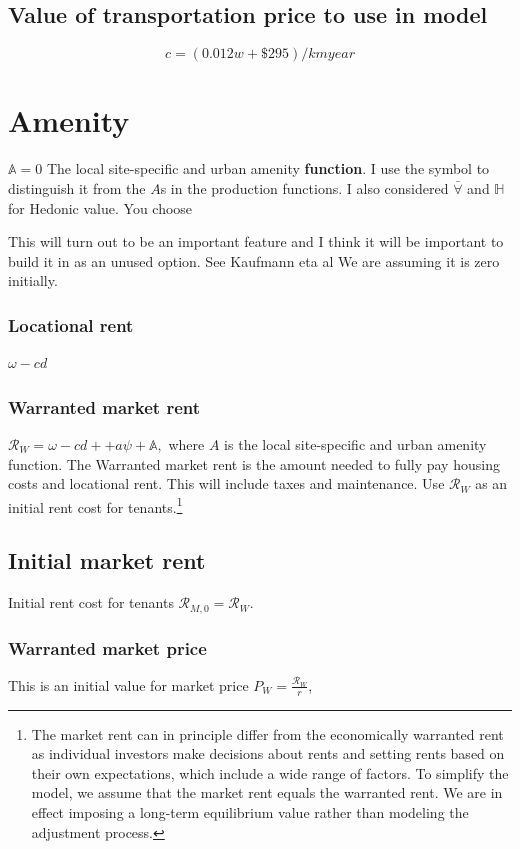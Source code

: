\subsection{Value of transportation price to use in model}
\[ {c}=(0.012 w+ \$295)/km year \]


\section{Amenity} 
$\mathbb{A}=0$
The local site-specific and urban amenity \textbf{function}.  I use the symbol to distinguish it from the $A$s in the production functions. I also  considered  $\bar\forall$ and $\mathbb{H}$ for Hedonic value. You choose

This will turn out to be an important feature and I think it will be important to build it in as an unused option. See Kaufmann eta  al \cite{kaufmannScalingUrbanAmenities2022} We are assuming it is zero initially.

\subsubsection{Locational rent}  $\omega-cd$ 

\subsubsection{Warranted market rent} $\mathcal{R}_W = \omega - cd+ + a\psi + \mathbb{A},$
where $A$ is the local site-specific and urban amenity function. The Warranted \gls{market rent} is the amount needed to fully pay housing costs and locational rent. This will include taxes and maintenance. Use  $\mathcal{R}_W$ as an initial rent cost for tenants.\footnote{The market rent can in principle differ from the economically warranted rent as individual investors make decisions about rents and setting rents based on their own expectations, which include a wide range of factors. To simplify the model, we assume that the market rent equals the warranted rent. We are in effect imposing a long-term equilibrium value rather than modeling the adjustment process.} 

\subsection{Initial market rent} 
Initial rent cost for tenants  $\mathcal{R}_{M, 0}= \mathcal{R}_W$.

\subsubsection{Warranted market price}  
This is  an initial value for market price 
 $P_W=\frac{\mathcal{R}_W }{r}$,  

